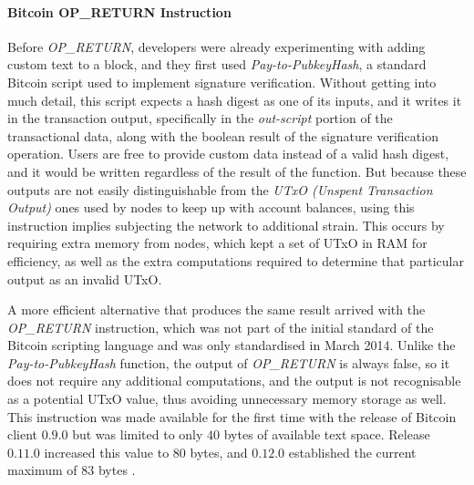 \documentclass[../access.tex]{subfiles}
\begin{document}
        \paragraph{Bitcoin OP\_RETURN Instruction}
            Before \textit{OP\_RETURN}, developers were already experimenting with adding custom text to a block, and they first used \textit{Pay-to-PubkeyHash}, a standard Bitcoin script used to implement signature verification. Without getting into much detail, this script expects a hash digest as one of its inputs, and it writes it in the transaction output, specifically in the \textit{out-script} portion of the transactional data, along with the boolean result of the signature verification operation. Users are free to provide custom data instead of a valid hash digest, and it would be written regardless of the result of the function. But because these outputs are not easily distinguishable from the \textit{UTxO (Unspent Transaction Output)} ones used by nodes to keep up with account balances, using this instruction implies subjecting the network to additional strain. This occurs by requiring extra memory from nodes, which kept a set of UTxO in RAM for efficiency, as well as the extra computations required to determine that particular output as an invalid UTxO.
            \par
            A more efficient alternative that produces the same result arrived with the \textit{OP\_RETURN} instruction, which was not part of the initial standard of the Bitcoin scripting language and was only standardised in March 2014. Unlike the \textit{Pay-to-PubkeyHash} function, the output of \textit{OP\_RETURN} is always false, so it does not require any additional computations, and the output is not recognisable as a potential UTxO value, thus avoiding unnecessary memory storage as well. This instruction was made available for the first time with the release of Bitcoin client $ 0.9.0 $ but was limited to only $40$ bytes of available text space. Release $ 0.11.0 $ increased this value to $80$ bytes, and $ 0.12.0 $ established the current maximum of $83$ bytes \cite{Bartoletti2017}.
            
\end{document}
